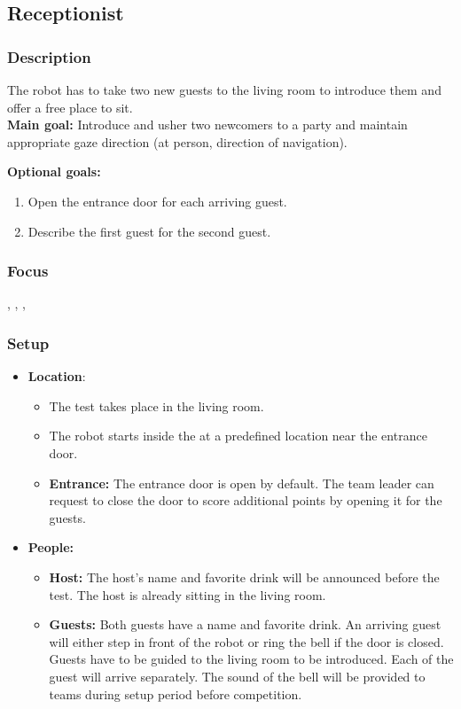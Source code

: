 \subsection{Receptionist}
\label{test:receptionist}
\subsubsection*{Description}
The robot has to take two new guests to the living room to introduce them and offer a free place to sit.\\
    
\textbf{Main goal:}
    Introduce and usher two newcomers to a party and maintain appropriate gaze direction (at person, direction of navigation).

\textbf{Optional goals:}
\begin{enumerate}[nosep]
	\item Open the entrance door for each arriving guest.
	\item Describe the first guest for the second guest.
\end{enumerate}

\subsubsection*{Focus}
\SysI{}, \HRI{}, \PerDet{}, \PerRec

\subsubsection*{Setup}
\begin{itemize}
	\item \textbf{Location}: 
	\begin{itemize}
	\item The test takes place in the living room.	
	\item The robot starts inside the \Arena{} at a predefined location near the entrance door.
	\item \textbf{Entrance:} The entrance door is open by default. The team leader can request to close the door to score additional points by opening it for the guests.
	\end{itemize}
	
	\item \textbf{People:} 
	\begin{itemize}
	\item \textbf{Host:} The host's name and favorite drink will be announced before the test. The host is already sitting in the living room.

	\item \textbf{Guests:} Both guests have a name and favorite drink. An arriving guest will either step in front of the robot or ring the bell if the door is closed. Guests have to be guided to the living room to be introduced. Each of the guest will arrive separately. The sound of the bell will be provided to teams
	during setup period before competition.
	\end{itemize}

\end{itemize}

